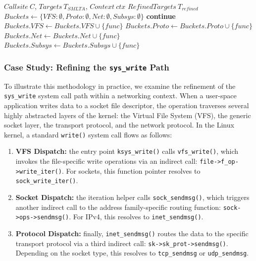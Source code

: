\begin{algorithm}[ht]
\caption{General Context-Sensitive Refinement Algorithm}
\label{alg:general_refinement}
\begin{algorithmic}[1]
\Require $Callsite\ C$, $Targets\ T_{SMLTA}$, $Context\ ctx$
\Ensure $RefinedTargets\ T_{refined}$
\State $Buckets \gets \{VFS: \emptyset, Proto: \emptyset, Net: \emptyset, Subsys: \emptyset\}$
        \State \textbf{continue} 
    \EndIf
        \State $Buckets.VFS \gets Buckets.VFS \cup \{func\}$
        \State $Buckets.Proto \gets Buckets.Proto \cup \{func\}$
        \State $Buckets.Net \gets Buckets.Net \cup \{func\}$
        \State $Buckets.Subsys \gets Buckets.Subsys \cup \{func\}$
    \EndIf
\EndFor
\State \Return {}
\end{algorithmic}
\end{algorithm}

\subsubsection{Case Study: Refining the \texttt{sys\_write} Path}

To illustrate this methodology in practice, we examine the refinement of the \texttt{sys\_write} system call path within a networking context.
When a user-space application writes data to a socket file descriptor, the operation traverses several highly abstracted layers of the kernel: the Virtual File System (VFS), the generic socket layer, the transport protocol, and the network protocol. 
In the Linux kernel, a standard \texttt{write()} system call flows as follows:
\begin{enumerate}
    \item \textbf{VFS Dispatch:} the entry point \texttt{ksys\_write()} calls \texttt{vfs\_write()}, which invokes the file-specific write operations via an indirect call: \texttt{file->f\_op->write\_iter()}. For sockets, this function pointer resolves to \texttt{sock\_write\_iter()}.
    \item \textbf{Socket Dispatch:} the iteration helper calls \texttt{sock\_sendmsg()}, which triggers another indirect call to the address family-specific routing function: \texttt{sock->ops->sendmsg()}. For IPv4, this resolves to \texttt{inet\_sendmsg()}.
    \item \textbf{Protocol Dispatch:} finally, \texttt{inet\_sendmsg()} routes the data to the specific transport protocol via a third indirect call: \texttt{sk->sk\_prot->sendmsg()}. Depending on the socket type, this resolves to \texttt{tcp\_sendmsg} or \texttt{udp\_sendmsg}.
\end{enumerate}

